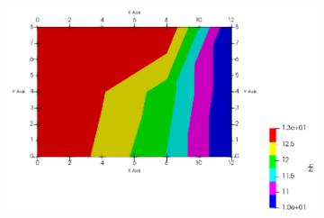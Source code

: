 \documentclass{article} %
\begin{document}
\begin{figure}[H]
\begin{subfigure}[b]{0.49\textwidth}
	\label{}
\end{subfigure}
	\begin{subfigure}[b]{0.49\textwidth}
	\includegraphics[width=\textwidth]{option2_ahh}

	\label{}
\end{subfigure}\\


\end{figure}
\end{document}
